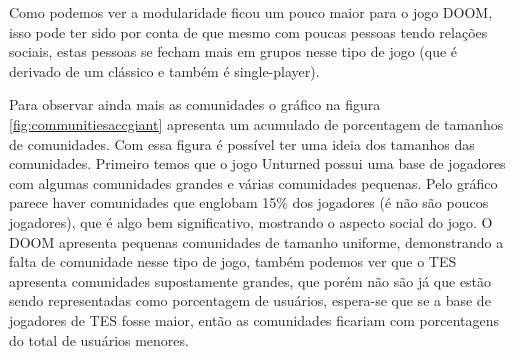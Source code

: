 \documentclass[12pt]{article}
\begin{document}
Como podemos ver a modularidade ficou um pouco maior para o jogo DOOM, isso pode ter sido por conta de que mesmo com poucas pessoas tendo relações sociais, estas pessoas se fecham mais em grupos nesse tipo de jogo (que é derivado de um clássico e também é single-player).




Para observar ainda mais as comunidades o gráfico na figura \ref{fig:communitiesaccgiant} apresenta um acumulado de porcentagem de tamanhos de comunidades. Com essa figura é possível ter uma ideia dos tamanhos das comunidades. Primeiro temos que o jogo Unturned possui uma base de jogadores com algumas comunidades grandes e várias comunidades pequenas. Pelo gráfico parece haver comunidades que englobam 15\% dos jogadores (é não são poucos jogadores), que é algo bem significativo, mostrando o aspecto social do jogo. O DOOM apresenta pequenas comunidades de tamanho uniforme, demonstrando a falta de comunidade nesse tipo de jogo, também podemos ver que o TES apresenta comunidades supostamente grandes, que porém não são já que estão sendo representadas como porcentagem de usuários, espera-se que se a base de jogadores de TES fosse maior, então as comunidades ficariam com porcentagens do total de usuários menores.
\end{document}
